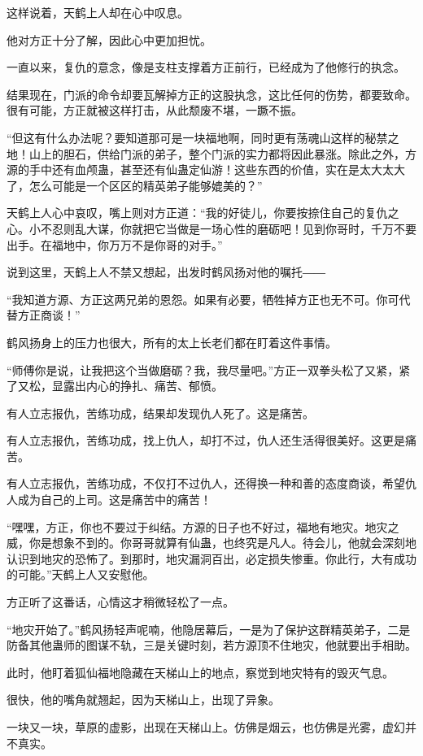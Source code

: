 \begin{this_body}
这样说着，天鹤上人却在心中叹息。

他对方正十分了解，因此心中更加担忧。

一直以来，复仇的意念，像是支柱支撑着方正前行，已经成为了他修行的执念。

结果现在，门派的命令却要瓦解掉方正的这股执念，这比任何的伤势，都要致命。很有可能，方正就被这样打击，从此颓废不堪，一蹶不振。

“但这有什么办法呢？要知道那可是一块福地啊，同时更有荡魂山这样的秘禁之地！山上的胆石，供给门派的弟子，整个门派的实力都将因此暴涨。除此之外，方源的手中还有血颅蛊，甚至还有仙蛊定仙游！这些东西的价值，实在是太大太大了，怎么可能是一个区区的精英弟子能够媲美的？”

天鹤上人心中哀叹，嘴上则对方正道：“我的好徒儿，你要按捺住自己的复仇之心。小不忍则乱大谋，你就把它当做是一场心性的磨砺吧！见到你哥时，千万不要出手。在福地中，你万万不是你哥的对手。”

说到这里，天鹤上人不禁又想起，出发时鹤风扬对他的嘱托――

“我知道方源、方正这两兄弟的恩怨。如果有必要，牺牲掉方正也无不可。你可代替方正商谈！”

鹤风扬身上的压力也很大，所有的太上长老们都在盯着这件事情。

“师傅你是说，让我把这个当做磨砺？我，我尽量吧。”方正一双拳头松了又紧，紧了又松，显露出内心的挣扎、痛苦、郁愤。

有人立志报仇，苦练功成，结果却发现仇人死了。这是痛苦。

有人立志报仇，苦练功成，找上仇人，却打不过，仇人还生活得很美好。这更是痛苦。

有人立志报仇，苦练功成，不仅打不过仇人，还得换一种和善的态度商谈，希望仇人成为自己的上司。这是痛苦中的痛苦！

“嘿嘿，方正，你也不要过于纠结。方源的日子也不好过，福地有地灾。地灾之威，你是想象不到的。你哥哥就算有仙蛊，也终究是凡人。待会儿，他就会深刻地认识到地灾的恐怖了。到那时，地灾漏洞百出，必定损失惨重。你此行，大有成功的可能。”天鹤上人又安慰他。

方正听了这番话，心情这才稍微轻松了一点。

“地灾开始了。”鹤风扬轻声呢喃，他隐居幕后，一是为了保护这群精英弟子，二是防备其他蛊师的图谋不轨，三是关键时刻，若方源顶不住地灾，他就要出手相助。

此时，他盯着狐仙福地隐藏在天梯山上的地点，察觉到地灾特有的毁灭气息。

很快，他的嘴角就翘起，因为天梯山上，出现了异象。

一块又一块，草原的虚影，出现在天梯山上。仿佛是烟云，也仿佛是光雾，虚幻并不真实。


\end{this_body}
